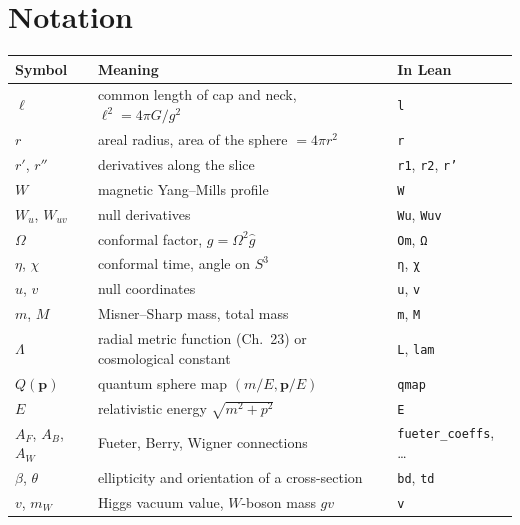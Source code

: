 \chapter{Notation}\label{app:D}

\begin{longtable}{@{}lp{}l@{}}
\toprule Symbol & Meaning & In Lean\\\midrule\endhead
$\ell$ & common length of cap and neck, $\ell^2=4\pi G/g^2$ & \texttt{l}\\
$r$ & areal radius, area of the sphere $=4\pi r^2$ & \texttt{r}\\
$r'$, $r''$ & derivatives along the slice & \texttt{r1}, \texttt{r2}, \texttt{r'}\\
$W$ & magnetic Yang--Mills profile & \texttt{W}\\
$W_u$, $W_{uv}$ & null derivatives & \texttt{Wu}, \texttt{Wuv}\\
$\Omega$ & conformal factor, $g=\Omega^2\hat g$ & \texttt{Om}, \texttt{Ω}\\
$\eta$, $\chi$ & conformal time, angle on $S^3$ & \texttt{η}, \texttt{χ}\\
$u$, $v$ & null coordinates & \texttt{u}, \texttt{v}\\
$m$, $M$ & Misner--Sharp mass, total mass & \texttt{m}, \texttt{M}\\
$\Lambda$ & radial metric function (Ch.~23) or cosmological constant & \texttt{L}, \texttt{lam}\\
$Q(\mathbf p)$ & quantum sphere map $(m/E,\mathbf p/E)$ & \texttt{qmap}\\
$E$ & relativistic energy $\sqrt{m^2+p^2}$ & \texttt{E}\\
$A_F$, $A_B$, $A_W$ & Fueter, Berry, Wigner connections & \texttt{fueter\_coeffs}, \dots\\
$\beta$, $\theta$ & ellipticity and orientation of a cross-section & \texttt{bd}, \texttt{td}\\
$v$, $m_W$ & Higgs vacuum value, $W$-boson mass $gv$ & \texttt{v}\\
\bottomrule
\end{longtable}

